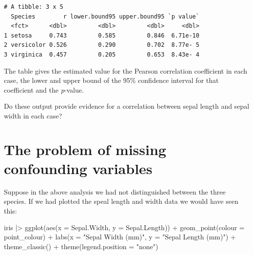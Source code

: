 \documentclass[
  letterpaper,
  DIV=11,
  numbers=noendperiod]{scrreprt}
\newenvironment{Shaded}{\begin{snugshade}}{\end{snugshade}}
\newcommand{\AttributeTok}[1]{\textcolor[rgb]{0.40,0.45,0.13}{#1}}
\newcommand{\DecValTok}[1]{\textcolor[rgb]{0.68,0.00,0.00}{#1}}
\newcommand{\FunctionTok}[1]{\textcolor[rgb]{0.28,0.35,0.67}{#1}}
\newcommand{\NormalTok}[1]{\textcolor[rgb]{0.00,0.23,0.31}{#1}}
\newcommand{\OtherTok}[1]{\textcolor[rgb]{0.00,0.23,0.31}{#1}}
\newcommand{\SpecialCharTok}[1]{\textcolor[rgb]{0.37,0.37,0.37}{#1}}
\newcommand{\StringTok}[1]{\textcolor[rgb]{0.13,0.47,0.30}{#1}}
\begin{document}
\begin{Shaded}
\end{Shaded}

\begin{verbatim}
# A tibble: 3 x 5
  Species        r lower.bound95 upper.bound95 `p value`
  <fct>      <dbl>         <dbl>         <dbl>     <dbl>
1 setosa     0.743         0.585         0.846  6.71e-10
2 versicolor 0.526         0.290         0.702  8.77e- 5
3 virginica  0.457         0.205         0.653  8.43e- 4
\end{verbatim}

The table gives the estimated value for the Pearson correlation
coefficient in each case, the lower and upper bound of the 95\%
confidence interval for that coefficient and the \emph{p}-value.

Do these output provide evidence for a correlation between sepal length
and sepal width in each case?

\section{The problem of missing confounding
variables}\label{the-problem-of-missing-confounding-variables}

Suppose in the above analysis we had not distinguished between the three
species. If we had plotted the speal length and width data we would have
seen this:

\begin{Shaded}
\begin{Highlighting}[]
\NormalTok{iris }\SpecialCharTok{|\textgreater{}}
  \FunctionTok{ggplot}\NormalTok{(}\FunctionTok{aes}\NormalTok{(}\AttributeTok{x =}\NormalTok{ Sepal.Width, }\AttributeTok{y =}\NormalTok{ Sepal.Length)) }\SpecialCharTok{+}
  \FunctionTok{geom\_point}\NormalTok{(}\AttributeTok{colour =}\NormalTok{ point\_colour) }\SpecialCharTok{+}
  \FunctionTok{labs}\NormalTok{(}\AttributeTok{x =} \StringTok{"Sepal Width (mm)"}\NormalTok{,}
       \AttributeTok{y =} \StringTok{"Sepal Length (mm)"}\NormalTok{) }\SpecialCharTok{+}
  \FunctionTok{theme\_classic}\NormalTok{() }\SpecialCharTok{+}
  \FunctionTok{theme}\NormalTok{(}\AttributeTok{legend.position =} \StringTok{"none"}\NormalTok{)}
\end{Highlighting}
\end{Shaded}
\end{document}
